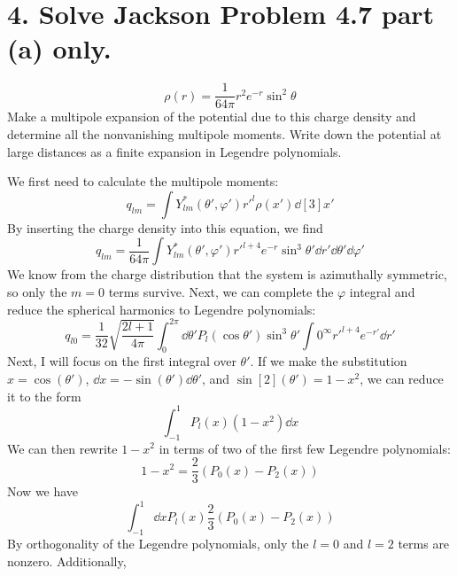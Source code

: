 \documentclass[a4paper,twoside]{article}
\begin{document}
\section*{4. Solve Jackson Problem 4.7 part (a) only.}
\begin{equation}
    \rho(r) = \frac{1}{64 \pi} r^2 e^{-r} \sin^2 \theta 
\end{equation}
Make a multipole expansion of the potential due to this charge density and determine all the nonvanishing multipole moments. Write down the potential at large distances as a finite expansion in Legendre polynomials.
\begin{tcolorbox}[breakable]
    We first need to calculate the multipole moments:
    \begin{equation}
        q_{lm} = \int Y^*_{lm}( \theta', \varphi') r'^l \rho(x') \dd[3]{x'}
    \end{equation}
    By inserting the charge density into this equation, we find
    \begin{equation}
        q_{lm} = \frac{1}{64 \pi} \int Y^*_{lm}( \theta', \varphi' ) r'^{l+4} e^{-r} \sin^3\theta' \dd{r'} \dd{\theta'} \dd{\varphi'}
    \end{equation}
    We know from the charge distribution that the system is azimuthally symmetric, so only the $ m = 0 $ terms survive. Next, we can complete the $\varphi$ integral and reduce the spherical harmonics to Legendre polynomials:
    \begin{equation}
        q_{l0} = \frac{1}{32} \sqrt{\frac{2l+1}{4 \pi}} \int_0^{2 \pi} \dd{\theta'} P_l(\cos\theta')\sin^3\theta' \int0^{\infty} r'^{l+4} e^{-r'} \dd{r'}
    \end{equation}
    Next, I will focus on the first integral over $ \theta' $. If we make the substitution $ x = \cos(\theta') $, $ \dd{x} = - \sin(\theta') \dd{\theta'} $, and $ \sin[2](\theta') = 1 - x^2 $, we can reduce it to the form
    \begin{equation}
        \int_{-1}^{1} P_l(x)(1-x^2) \dd{x}
    \end{equation}
    We can then rewrite $ 1 - x^2 $ in terms of two of the first few Legendre polynomials:
    \begin{equation}
        1 - x^2 = \frac{2}{3} (P_0(x) - P_2(x))
    \end{equation}
    Now we have
    \begin{equation}
        \int_{-1}^{1} \dd{x} P_l(x)\frac{2}{3} (P_0(x) - P_2(x))
    \end{equation}
    By orthogonality of the Legendre polynomials, only the $ l = 0 $ and $ l = 2 $ terms are nonzero. Additionally,

\end{tcolorbox}
\end{document}
